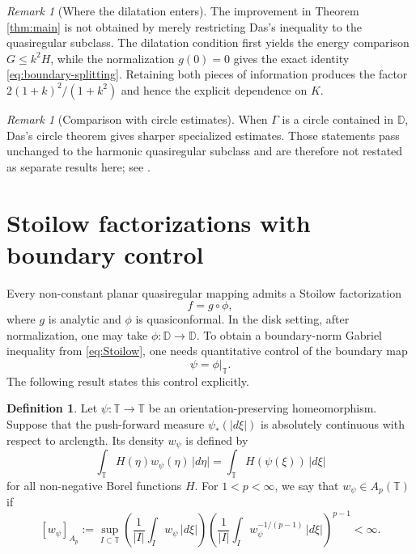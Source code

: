 \documentclass[11pt]{article}
\theoremstyle{definition}
\newtheorem{definition}[theorem]{Definition}
\theoremstyle{remark}
\newtheorem{remark}[theorem]{Remark}
\newcommand{\D}{\mathbb D}
\newcommand{\T}{\mathbb T}
\begin{document}
\begin{remark}[Where the dilatation enters]\label{rem:dilatation}
The improvement in Theorem \ref{thm:main} is not obtained by merely restricting Das's inequality to the quasiregular subclass. The dilatation condition first yields the energy comparison $G\le k^2H$, while the normalization $g(0)=0$ gives the exact identity \eqref{eq:boundary-splitting}. Retaining both pieces of information produces the factor $2(1+k)^2/(1+k^2)$ and hence the explicit dependence on $K$.
\end{remark}

\begin{remark}[Comparison with circle estimates]
When $\Gamma$ is a circle contained in $\D$, Das's circle theorem gives sharper specialized estimates. Those statements pass unchanged to the harmonic quasiregular subclass and are therefore not restated as separate results here; see \cite[Theorem~4]{Das2025}.
\end{remark}

\section{Stoilow factorizations with boundary control}

Every non-constant planar quasiregular mapping admits a Stoilow factorization
\begin{equation}\label{eq:Stoilow}
   f=g\circ\phi,
\end{equation}
where $g$ is analytic and $\phi$ is quasiconformal. In the disk setting, after normalization, one may take $\phi:\D\to\D$. To obtain a boundary-norm Gabriel inequality from \eqref{eq:Stoilow}, one needs quantitative control of the boundary map
\[
   \psi=\phi|_\T.
\]
The following result states this control explicitly.

\begin{definition}\label{def:weight}
Let $\psi:\T\to\T$ be an orientation-preserving homeomorphism. Suppose that the push-forward measure $\psi_*(|d\xi|)$ is absolutely continuous with respect to arclength. Its density $w_\psi$ is defined by
\[
   \int_\T H(\eta)w_\psi(\eta)\,|d\eta|
   =\int_\T H(\psi(\xi))\,|d\xi|
\]
for all non-negative Borel functions $H$.
For $1<p<\infty$, we say that $w_\psi\in A_p(\T)$ if
\[
   [w_\psi]_{A_p}
   :=\sup_{I\subset\T}
   \left(\frac1{|I|}\int_I w_\psi\,|d\xi|\right)
   \left(\frac1{|I|}\int_I w_\psi^{-1/(p-1)}\,|d\xi|\right)^{p-1}<\infty.
\]
\end{definition}
\end{document}
